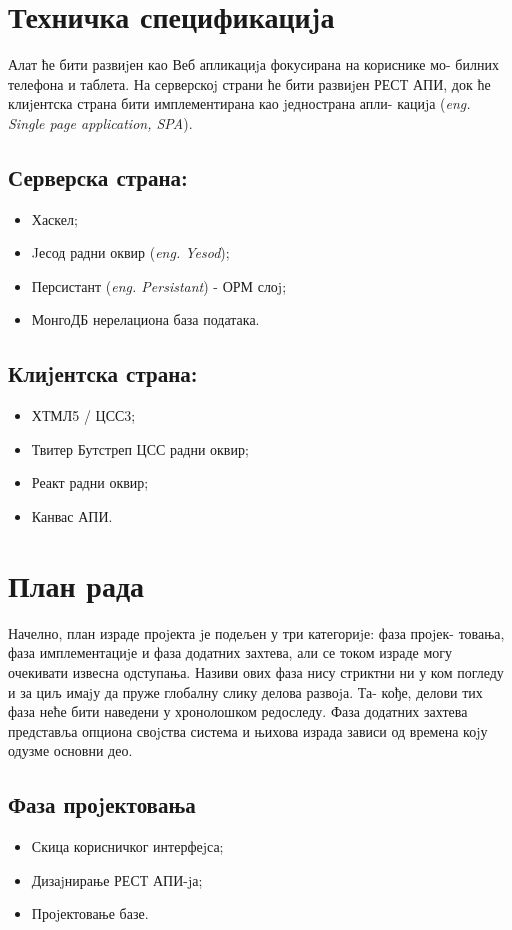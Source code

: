 \documentclass[a4paper]{article}
\begin{document}
\section{Техничка спецификациjа}
Алат ће бити развиjен као Веб апликациjа фокусирана на кориснике мо-
билних телефона и таблета. На серверскоj страни ће бити развиjен РЕСТ
АПИ, док ће клиjентска страна бити имплементирана као jеднострана апли-
кациjа (\textit{eng. Single page application, SPA}).\\

\subsection{Серверска страна:}
\begin{itemize}
	\item Хаскел;
	\item Jесод радни оквир (\textit{eng. Yesod});
	\item Персистант (\textit{eng. Persistant}) - ОРМ слоj;
	\item МонгоДБ нерелациона база података.
\end{itemize}

\subsection{Клиjентска страна:}
\begin{itemize}
	\item ХТМЛ5 / ЦСС3;
	\item Твитер Бутстреп ЦСС радни оквир;
	\item Реакт радни оквир;
	\item Канвас АПИ.
\end{itemize}


\section{План рада}
Начелно, план израде проjекта jе подељен у три категориjе: фаза проjек-
товања, фаза имплементациjе и фаза додатних захтева, али се током израде
могу очекивати извесна одступања. Називи ових фаза нису стриктни ни у
ком погледу и за циљ имаjу да пруже глобалну слику делова развоjа. Та-
кође, делови тих фаза неће бити наведени у хронолошком редоследу. Фаза
додатних захтева представља опциона своjства система и њихова израда
зависи од времена коjу одузме основни део.

\subsection{Фаза проjектовања}
\begin{itemize}
	\item Скица корисничког интерфеjса;
	\item Дизаjнирање РЕСТ АПИ-jа;
	\item Проjектовање базе.
\end{itemize}
\end{document}
